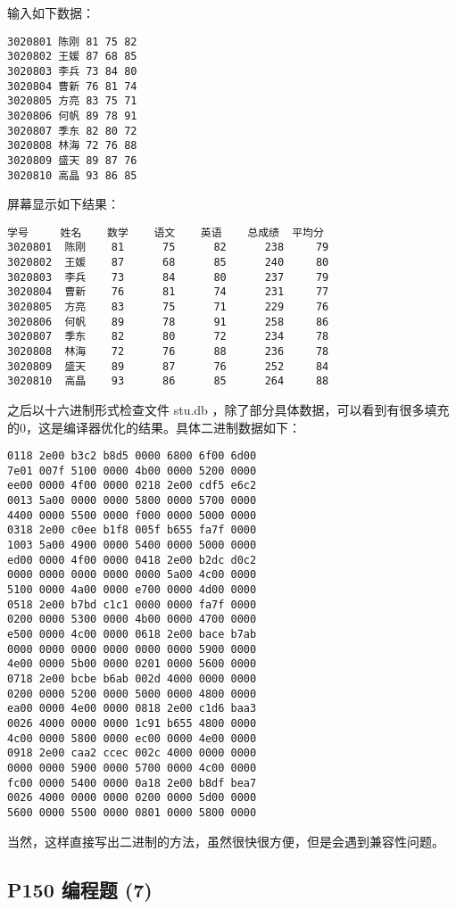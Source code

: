 \documentclass[cs4size,a4paper,nofonts]{ctexart}
\begin{document}
输入如下数据：
\begin{verbatim}
3020801 陈刚 81 75 82
3020802 王媛 87 68 85
3020803 李兵 73 84 80
3020804 曹新 76 81 74
3020805 方亮 83 75 71
3020806 何帆 89 78 91
3020807 季东 82 80 72
3020808 林海 72 76 88
3020809 盛天 89 87 76
3020810 高晶 93 86 85
\end{verbatim}

屏幕显示如下结果：
\begin{verbatim}
学号     姓名    数学    语文    英语    总成绩  平均分
3020801  陈刚    81      75      82      238     79
3020802  王媛    87      68      85      240     80
3020803  李兵    73      84      80      237     79
3020804  曹新    76      81      74      231     77
3020805  方亮    83      75      71      229     76
3020806  何帆    89      78      91      258     86
3020807  季东    82      80      72      234     78
3020808  林海    72      76      88      236     78
3020809  盛天    89      87      76      252     84
3020810  高晶    93      86      85      264     88
\end{verbatim}

之后以十六进制形式检查文件 {\sf stu.db }，除了部分具体数据，可以看到有很多填充的0，这是编译器优化的结果。具体二进制数据如下：
\begin{verbatim}
0118 2e00 b3c2 b8d5 0000 6800 6f00 6d00
7e01 007f 5100 0000 4b00 0000 5200 0000
ee00 0000 4f00 0000 0218 2e00 cdf5 e6c2
0013 5a00 0000 0000 5800 0000 5700 0000
4400 0000 5500 0000 f000 0000 5000 0000
0318 2e00 c0ee b1f8 005f b655 fa7f 0000
1003 5a00 4900 0000 5400 0000 5000 0000
ed00 0000 4f00 0000 0418 2e00 b2dc d0c2
0000 0000 0000 0000 0000 5a00 4c00 0000
5100 0000 4a00 0000 e700 0000 4d00 0000
0518 2e00 b7bd c1c1 0000 0000 fa7f 0000
0200 0000 5300 0000 4b00 0000 4700 0000
e500 0000 4c00 0000 0618 2e00 bace b7ab
0000 0000 0000 0000 0000 0000 5900 0000
4e00 0000 5b00 0000 0201 0000 5600 0000
0718 2e00 bcbe b6ab 002d 4000 0000 0000
0200 0000 5200 0000 5000 0000 4800 0000
ea00 0000 4e00 0000 0818 2e00 c1d6 baa3
0026 4000 0000 0000 1c91 b655 4800 0000
4c00 0000 5800 0000 ec00 0000 4e00 0000
0918 2e00 caa2 ccec 002c 4000 0000 0000
0000 0000 5900 0000 5700 0000 4c00 0000
fc00 0000 5400 0000 0a18 2e00 b8df bea7
0026 4000 0000 0000 0200 0000 5d00 0000
5600 0000 5500 0000 0801 0000 5800 0000
\end{verbatim}

当然，这样直接写出二进制的方法，虽然很快很方便，但是会遇到兼容性问题。

\subsection{P150 编程题 (7)}
\end{document}
